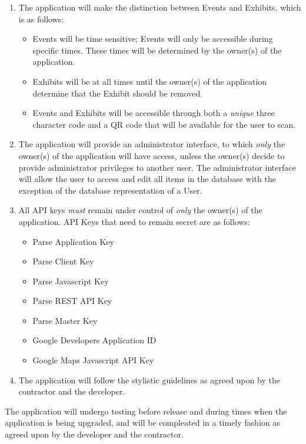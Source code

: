 \documentclass{article}
\begin{document}
\begin{multicols}{2}
\begin{enumerate}
\item The application will make the distinction between Events and Exhibits, which is as follows:
\begin{itemize}
\item Events will be time sensitive; Events will only be accessible during specific times. These times will be determined by the owner(s) of the application.
\item Exhibits will be at all times until the owner(s) of the application determine that the Exhibit should be removed.
\item Events and Exhibits will be accessible through both a \textit{unique} three character code and a QR code that will be available for the user to scan.
\end{itemize}
\item The application will provide an administrator interface, to which \textit{only} the owner(s) of the application will have access, unless the owner(s) decide to provide administrator privileges to another user. The administrator interface will allow the user to access and edit all items in the database with the exception of the database representation of a User.
\item All API keys \textit{must} remain under control of \textit{only} the owner(s) of the application. API Keys that need to remain secret are as follows:
\begin{itemize}
\item Parse Application Key
\item Parse Client Key
\item Parse Javascript Key
\item Parse REST API Key
\item Parse Master Key
\item Google Developers Application ID
\item Google Maps Javascript API Key
\end{itemize}
\item The application will follow the stylistic guidelines as agreed upon by the contractor and the developer.
\end{enumerate}
\end{multicols}
The application will undergo testing before release and during times when the application is being upgraded, and will be compleated in a timely fashion as agreed upon by the developer and the contractor.
\vspace{1cm}
\end{document}
